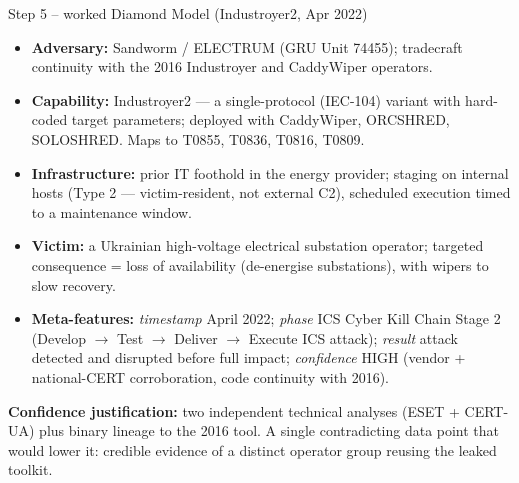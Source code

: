 \documentclass[11pt,a4paper]{article}
\begin{document}
\begin{solutionbox}{Step 5 -- worked Diamond Model (Industroyer2, Apr 2022)}
\begin{itemize}[leftmargin=*, nosep]
  \item \textbf{Adversary:} Sandworm / ELECTRUM (GRU Unit 74455); tradecraft
        continuity with the 2016 Industroyer and CaddyWiper operators.
  \item \textbf{Capability:} Industroyer2 --- a single-protocol (IEC-104)
        variant with hard-coded target parameters; deployed with CaddyWiper,
        ORCSHRED, SOLOSHRED. Maps to T0855, T0836, T0816, T0809.
  \item \textbf{Infrastructure:} prior IT foothold in the energy provider;
        staging on internal hosts (Type 2 --- victim-resident, not external C2),
        scheduled execution timed to a maintenance window.
  \item \textbf{Victim:} a Ukrainian high-voltage electrical substation
        operator; targeted consequence = loss of availability (de-energise
        substations), with wipers to slow recovery.
  \item \textbf{Meta-features:} \emph{timestamp} April 2022; \emph{phase}
        ICS Cyber Kill Chain Stage 2 (Develop $\to$ Test $\to$ Deliver $\to$
        Execute ICS attack); \emph{result} attack detected and disrupted before
        full impact; \emph{confidence} HIGH (vendor + national-CERT corroboration,
        code continuity with 2016).
\end{itemize}
\textbf{Confidence justification:} two independent technical analyses (ESET +
CERT-UA) plus binary lineage to the 2016 tool. A single contradicting data point
that would lower it: credible evidence of a distinct operator group reusing the
leaked toolkit.
\end{solutionbox}
\end{document}
